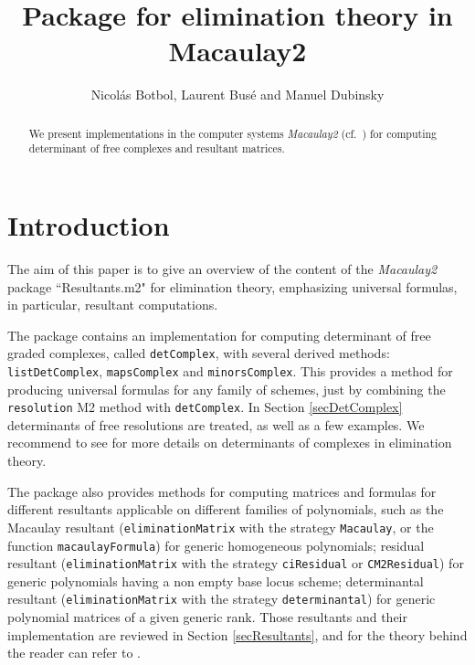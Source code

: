 \documentclass[10pt]{amsart}
\title{Package for elimination theory in Macaulay2}
\author{Nicol\'as Botbol, Laurent Bus\'e and  Manuel Dubinsky}
\theoremstyle{plain}
\theoremstyle{definition}
\begin{document}

\maketitle

\begin{abstract} 
We present implementations in the computer systems \textit{Macaulay2} (cf.\ \cite{M2}) for computing determinant of free complexes and resultant matrices.
\end{abstract}


\section{Introduction}\label{secIntro}
The aim of this paper is to give an overview of the content of the \textit{Macaulay2} package ``Resultants.m2" for elimination theory, emphasizing universal formulas, in particular, resultant computations. 

The package contains an implementation for computing determinant of free graded complexes, called \texttt{detComplex}, with several derived methods: \texttt{listDetComplex}, \texttt{mapsComplex} and \texttt{minorsComplex}. This provides a method for producing universal formulas for any family of schemes, just by combining the \texttt{resolution} M2 method with \texttt{detComplex}. In Section \ref{secDetComplex} determinants of free resolutions are treated, as well as a few examples. We recommend to see \cite{Dem84, Jou95, GKZ94, Buse1} for more details on determinants of complexes in elimination theory.

The package also provides methods for computing matrices and formulas for different resultants applicable on different families of polynomials, such as the Macaulay resultant (\texttt{eliminationMatrix} with the strategy \texttt{Macaulay}, or the function \texttt{macaulayFormula}) for generic homogeneous polynomials; residual resultant (\texttt{eliminationMatrix} with the strategy \texttt{ciResidual} or \texttt{CM2Residual}) for generic polynomials having a non empty base locus scheme;
determinantal resultant  (\texttt{eliminationMatrix} with the strategy \texttt{determinantal}) for generic polynomial matrices of a given generic rank. Those resultants and their implementation are reviewed in Section \ref{secResultants}, and for the theory behind the reader can refer to \cite{Jou91, Cha1, GKZ94, Jou95, Jou97, CLO98, BEM01, BusPhD, Buse1, Bus04}.
\end{document}
